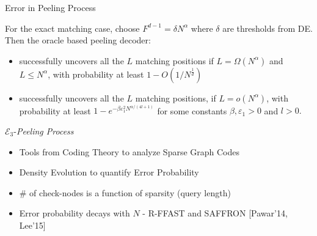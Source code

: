 \documentclass[10pt,xcolor=table]{beamer}
\begin{document}
\begin{frame}{Error in Peeling Process}

\begin{lemma}
For the exact matching case, choose $F^{d-1}=\delta N^\alpha$ where $\delta$ are thresholds from DE. Then the oracle based peeling decoder:
\begin{itemize}
\item successfully uncovers all the $L$ matching positions if $L=\Omega(N^{\alpha})$ and $L\leq N^{\alpha}$, with probability at least $1-O(1/N^{\frac{1}{d}})$
\item successfully uncovers all the $L$ matching positions, if $L=o(N^{\alpha})$, with probability at least $1-e^{-\beta \varepsilon_1^2N^{\alpha/(4l+1)}}$ for some constants $\beta,\varepsilon_1>0$ and $l>0.$
\end{itemize}\label{Lem:peeling_exact}
\end{lemma}

\begin{block}{$\mathcal{E}_3${-\it Peeling Process}}
\begin{itemize}
\item Tools from Coding Theory to analyze Sparse Graph Codes
\item Density Evolution to quantify Error Probability
\item \# of check-nodes is a function of sparsity (query length)
\item Error probability decays with $N$ - {\small R-FFAST and SAFFRON [Pawar'14, Lee'15]}
\end{itemize}
\end{block}
\end{frame}




\end{document}
